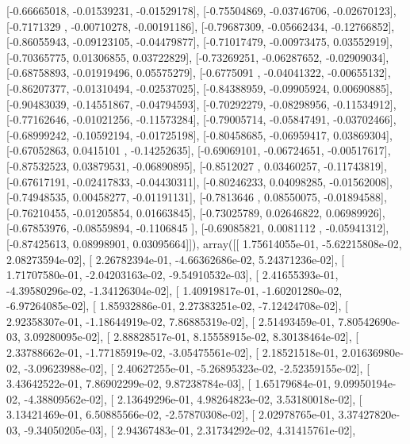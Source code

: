 \documentclass{article}
\begin{document}
       [-0.66665018, -0.01539231, -0.01529178],
       [-0.75504869, -0.03746706, -0.02670123],
       [-0.7171329 , -0.00710278, -0.00191186],
       [-0.79687309, -0.05662434, -0.12766852],
       [-0.86055943, -0.09123105, -0.04479877],
       [-0.71017479, -0.00973475,  0.03552919],
       [-0.70365775,  0.01306855,  0.03722829],
       [-0.73269251, -0.06287652, -0.02909034],
       [-0.68758893, -0.01919496,  0.05575279],
       [-0.6775091 , -0.04041322, -0.00655132],
       [-0.86207377, -0.01310494, -0.02537025],
       [-0.84388959, -0.09905924,  0.00690885],
       [-0.90483039, -0.14551867, -0.04794593],
       [-0.70292279, -0.08298956, -0.11534912],
       [-0.77162646, -0.01021256, -0.11573284],
       [-0.79005714, -0.05847491, -0.03702466],
       [-0.68999242, -0.10592194, -0.01725198],
       [-0.80458685, -0.06959417,  0.03869304],
       [-0.67052863,  0.0415101 , -0.14252635],
       [-0.69069101, -0.06724651, -0.00517617],
       [-0.87532523,  0.03879531, -0.06890895],
       [-0.8512027 ,  0.03460257, -0.11743819],
       [-0.67617191, -0.02417833, -0.04430311],
       [-0.80246233,  0.04098285, -0.01562008],
       [-0.74948535,  0.00458277, -0.01191131],
       [-0.7813646 ,  0.08550075, -0.01894588],
       [-0.76210455, -0.01205854,  0.01663845],
       [-0.73025789,  0.02646822,  0.06989926],
       [-0.67853976, -0.08559894, -0.1106845 ],
       [-0.69085821,  0.0081112 , -0.05941312],
       [-0.87425613,  0.08998901,  0.03095664]]), array([[  1.75614055e-01,  -5.62215808e-02,   2.08273594e-02],
       [  2.26782394e-01,  -4.66362686e-02,   5.24371236e-02],
       [  1.71707580e-01,  -2.04203163e-02,  -9.54910532e-03],
       [  2.41655393e-01,  -4.39580296e-02,  -1.34126304e-02],
       [  1.40919817e-01,  -1.60201280e-02,  -6.97264085e-02],
       [  1.85932886e-01,   2.27383251e-02,  -7.12424708e-02],
       [  2.92358307e-01,  -1.18644919e-02,   7.86885319e-02],
       [  2.51493459e-01,   7.80542690e-03,   3.09280095e-02],
       [  2.88828517e-01,   8.15558915e-02,   8.30138464e-02],
       [  2.33788662e-01,  -1.77185919e-02,  -3.05475561e-02],
       [  2.18521518e-01,   2.01636980e-02,  -3.09623988e-02],
       [  2.40627255e-01,  -5.26895323e-02,  -2.52359155e-02],
       [  3.43642522e-01,   7.86902299e-02,   9.87238784e-03],
       [  1.65179684e-01,   9.09950194e-02,  -4.38809562e-02],
       [  2.13649296e-01,   4.98264823e-02,   3.53180018e-02],
       [  3.13421469e-01,   6.50885566e-02,  -2.57870308e-02],
       [  2.02978765e-01,   3.37427820e-03,  -9.34050205e-03],
       [  2.94367483e-01,   2.31734292e-02,   4.31415761e-02],
\end{document}
